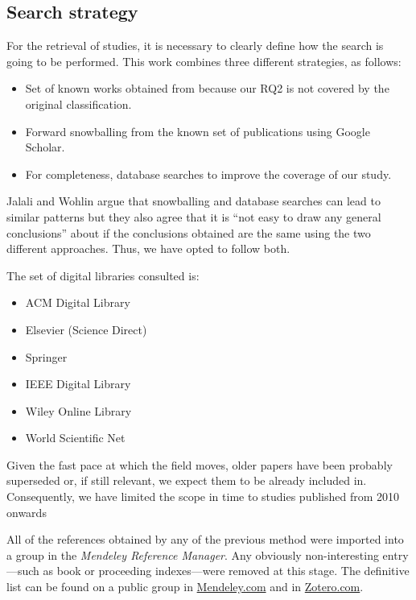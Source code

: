 \subsection{Search strategy}
\label{sec:mapping/search_strategy}

For the retrieval of studies, it is necessary to clearly define
how the search is going to be performed. This work combines
three different strategies, as follows:

\begin{itemize}
  \item Set of known works obtained from \cite{Idreos2015} because our RQ2 is
    not covered by the original classification.
  \item Forward snowballing\cite{Webster2002} from the known set of publications using Google Scholar.
  \item For completeness, database searches to improve the coverage of our study.
\end{itemize}

Jalali and Wohlin\cite{Jalali2012} argue that snowballing and database searches
can lead to similar patterns but they also agree that it is
``not easy to draw any general conclusions'' about if the conclusions obtained are the same
using the two different approaches. Thus, we have opted to follow both.

The set of digital libraries consulted is:

\begin{itemize}
  \item ACM Digital Library
  \item Elsevier (Science Direct)
  \item Springer
  \item IEEE Digital Library
  \item Wiley Online Library
  \item World Scientific Net
\end{itemize}

Given the fast pace at which the field moves, older papers have been probably
superseded or, if still relevant, we expect them to be already included in\cite{Idreos2015}.
Consequently, we have limited the scope in time to studies published from 2010 onwards

All of the references obtained by any of the previous method were imported into
a group in the \emph{Mendeley Reference Manager}. Any obviously non-interesting entry
---such as book or proceeding indexes---were removed at this stage.
The definitive list can be found on a public group in
\href{https://www.mendeley.com/community/interactive-data-exploration-in-science-systematic-mapping/}{Mendeley.com} and in
\href{https://www.zotero.org/groups/4517638/interactive-data-exploration-in-science-systematic-mapping/library}{Zotero.com}\footnotemark.

